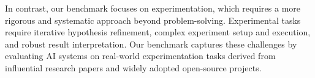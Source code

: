 In contrast, our benchmark focuses on experimentation, which requires a more rigorous and systematic approach beyond problem-solving. Experimental tasks require iterative hypothesis refinement, complex experiment setup and execution, and robust result interpretation.
Our benchmark captures these challenges by evaluating AI systems on real-world experimentation tasks derived from influential research papers and widely adopted open-source projects.




 




